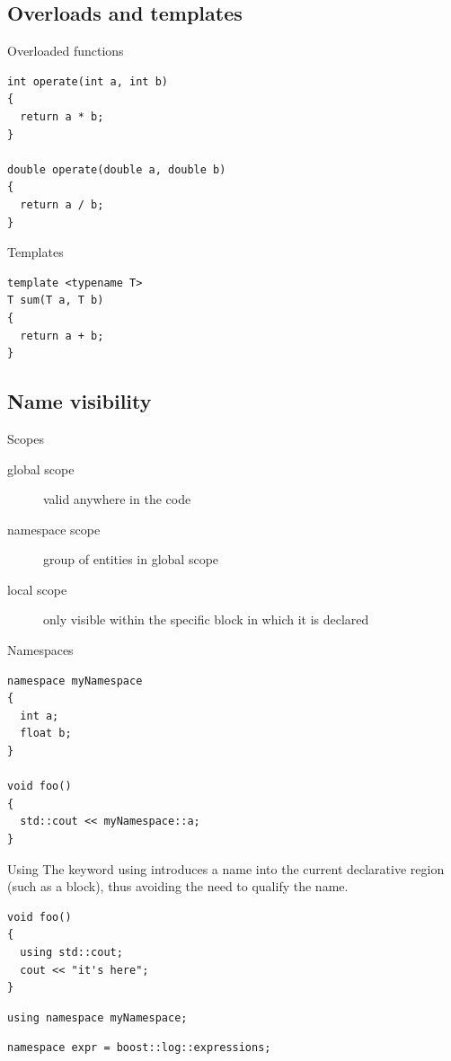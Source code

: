 \documentclass{beamer}
\begin{document}
\subsection{Overloads and templates}
\begin{frame}[fragile]{Overloaded functions}
\begin{lstlisting}[caption=Overloaded functions]
int operate(int a, int b)
{
  return a * b;
}

double operate(double a, double b)
{
  return a / b;
}
\end{lstlisting}
\end{frame}

\begin{frame}[fragile]{Templates}
\begin{lstlisting}[caption=Templates]
template <typename T>
T sum(T a, T b)
{
  return a + b;
}\end{lstlisting}
\end{frame}

\subsection{Name visibility}
\begin{frame}{Scopes}
\begin{description}
\item[global scope] valid anywhere in the code
\item[namespace scope] group of entities in global scope
\item[local scope] only visible within the specific block in which it is
declared
\end{description}
\end{frame}

\begin{frame}[fragile]{Namespaces}
\begin{lstlisting}[caption=Namespace]
namespace myNamespace
{
  int a;
  float b;
}

void foo()
{
  std::cout << myNamespace::a;
}
\end{lstlisting}
\end{frame}

\begin{frame}[fragile]{Using}
The keyword using introduces a name into the current declarative region (such as
a block), thus avoiding the need to qualify the name.
\begin{lstlisting}[caption=using]
void foo()
{
  using std::cout;
  cout << "it's here";
}
\end{lstlisting}
\begin{lstlisting}[caption=using namespace]
using namespace myNamespace;
\end{lstlisting}

\begin{lstlisting}[caption=namespace alias]
namespace expr = boost::log::expressions;
\end{lstlisting}

\end{frame}
\end{document}
